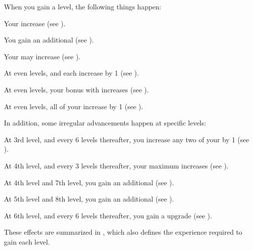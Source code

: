   When you gain a level, the following things happen:
  \begin{raggeditemize}
    \item Your  increase (see ).
    \item You gain an additional  (see ).
    \item Your  may increase (see ).
    \item At even levels,  and  each increase by 1 (see ).
    \item At even levels, your bonus with  increases (see ).
    \item At even levels, all of your  increase by 1 (see ).
  \end{raggeditemize}

  In addition, some irregular advancements happen at specific levels:
  \begin{raggeditemize}
    \item At 3rd level, and every 6 levels thereafter, you increase any two of your  by 1 (see ).
    \item At 4th level, and every 3 levels thereafter, your maximum  increases (see ).
    \item At 4th level and 7th level, you gain an additional  (see ).
    \item At 5th level and 8th level, you gain an additional  (see ).
    \item At 6th level, and every 6 levels thereafter, you gain a  upgrade (see ).
  \end{raggeditemize}

  These effects are summarized in , which also defines the experience required to gain each level.


